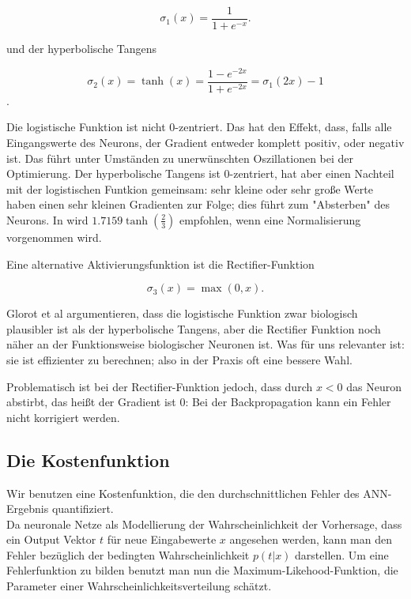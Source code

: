 \begin{equation}
\sigma_1(x) = \frac{1}{1+e^{-x}}.
\end{equation}

und der hyperbolische Tangens

\begin{equation}
\sigma_2(x) = \tanh(x) = \frac{1-e^{-2x}}{1+e^{-2x}} = 
\sigma_1(2x) -1
\end{equation}.

Die logistische Funktion ist nicht 0-zentriert. Das hat den Effekt, dass, falls alle Eingangswerte des Neurons, der Gradient entweder komplett positiv, oder negativ ist. Das führt unter Umständen zu unerwünschten Oszillationen bei der Optimierung. Der hyperbolische Tangens ist 0-zentriert, hat aber einen Nachteil mit der logistischen Funtkion gemeinsam: sehr kleine oder sehr große Werte haben einen sehr kleinen Gradienten zur Folge; dies führt zum "Absterben" des Neurons. 
In \cite{lecunefficient} wird $1.7159 \tanh(\frac{2}{3})$ empfohlen, wenn eine Normalisierung vorgenommen wird. 

Eine alternative Aktivierungsfunktion ist die Rectifier-Funktion 

\begin{equation}
\sigma_3(x) = \max(0,x).
\end{equation} 

Glorot et al argumentieren, dass die logistische Funktion zwar biologisch plausibler ist als der hyperbolische Tangens, aber die Rectifier Funktion noch näher an der Funktionsweise biologischer Neuronen ist. Was für uns relevanter ist: sie ist effizienter zu berechnen; also in der Praxis oft eine bessere Wahl. \cite{glorot2011deep}

Problematisch ist bei der Rectifier-Funktion jedoch, dass durch $x < 0$ das Neuron abstirbt, das heißt der Gradient ist 0: Bei der Backpropagation kann ein Fehler nicht korrigiert werden. \cite{bengio2012practical}


\subsection{Die Kostenfunktion}
Wir benutzen eine Kostenfunktion, die den durchschnittlichen Fehler des ANN-Ergebnis quantifiziert.\\

Da neuronale Netze als Modellierung der Wahrscheinlichkeit der Vorhersage, dass ein Output Vektor $t$ für neue Eingabewerte $x$ angesehen werden, kann man den Fehler bezüglich der bedingten Wahrscheinlichkeit $p(t|x)$ darstellen. 
Um eine Fehlerfunktion zu bilden benutzt man nun die Maximum-Likehood-Funktion, die Parameter einer Wahrscheinlichkeitsverteilung schätzt. 

